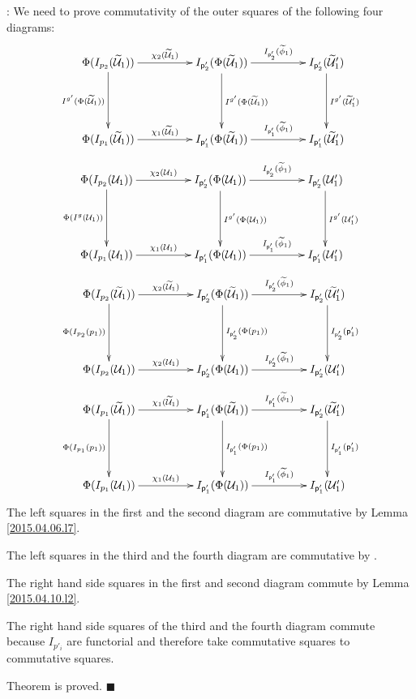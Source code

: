 \documentclass[12pt]{article}
\numberwithin{equation}{section}
\newenvironment{myproof}{{\bf Proof}:}{$\blacksquare$ \vskip 5mm }
\newcommand{\wt}{\widetilde}
\newcommand{\p}{\mathsf{p}}
\newcommand{\U}{\mathcal{U}}
\begin{document}
\begin{myproof}
We need to prove commutativity of the outer squares of the following four diagrams:
%
$$
\begin{xy}
          \xymatrix@C=4pc@R=4pc{
                 \Phi(I_{p_2}(\wt{\U}_1))  \ar[r]^-{\chi_2(\wt{\U}_1)} \ar[d]_-{I^{g'}(\Phi(\wt{\U}_1))} & 
                 I_{\p_2'}(\Phi(\wt{\U}_1)) \ar[r]^-{I_{\p_2'}(\wt{\phi}_1)} \ar[d]^-{I^{g'}(\Phi(\wt{\U}_1))} &
		I_{\p_2'}(\wt{\U}_1') \ar[d]^-{ I^{g'}(\wt{\U}_1')} \\
		\Phi(I_{p_1}(\wt{\U}_1))  \ar[r]^-{\chi_1(\wt{\U}_1)} &
		I_{\p_1'}(\Phi(\wt{\U}_1)) \ar[r]^-{I_{\p_1'}(\wt{\phi}_1)} &
		I_{\p_1'}(\wt{\U}_1')
                }
\end{xy}
$$
%
$$
\begin{xy}
          \xymatrix@C=4pc@R=4pc{ \Phi(I_{p_2}(\U_1)) \ar[r]^-{\chi_2(\U_1)}
            \ar[d]_-{\Phi(I^g(\U_1))} & I_{\p_2'}(\Phi(\U_1))
            \ar[r]^-{I_{\p_2'}(\wt{\phi}_1)} \ar[d]^-{I^{g'}(\Phi(\U_1))} &
            I_{\p_2'}(\U_1') \ar[d]^-{I^{g'}(\U_1')} \\ \Phi(I_{p_1}(\U_1))
            \ar[r]^-{\chi_1(\U_1)} & I_{\p_1'}(\Phi(\U_1))
            \ar[r]^-{I_{\p_1'}(\wt{\phi}_1)} & I_{\p_1'}(\U_1') }
\end{xy}
$$
%
$$
\begin{xy}
          \xymatrix@C=4pc@R=4pc{ \Phi(I_{p_2}(\wt{\U}_1))
            \ar[r]^-{\chi_2(\wt{\U}_1)} \ar[d]_-{\Phi(I_{p_2}(p_1))} &
            I_{\p_2'}(\Phi(\wt{\U}_1)) \ar[r]^-{I_{\p_2'}(\wt{\phi}_1)}
            \ar[d]^-{I_{\p_2'}(\Phi(p_1))} & I_{\p_2'}(\wt{\U}_1')
            \ar[d]^-{I_{\p_2'}(\p_1')} \\ \Phi(I_{p_2}(\U_1))
            \ar[r]^-{\chi_2(\U_1)} & I_{\p_2'}(\Phi(\U_1))
            \ar[r]^-{I_{\p_2'}(\wt{\phi}_1)} & I_{\p_2'}(\U_1') }
\end{xy}
$$
%
$$
\begin{xy}
          \xymatrix@C=4pc@R=4pc{ \Phi(I_{p_1}(\wt{\U}_1))
            \ar[r]^-{\chi_1(\wt{\U}_1)} \ar[d]_-{\Phi(I_{p_1}(p_1))} &
            I_{\p_1'}(\Phi(\wt{\U}_1)) \ar[r]^-{I_{\p_1'}(\wt{\phi}_1)}
            \ar[d]^-{I_{\p_1'}(\Phi(p_1))} & I_{\p_2'}(\wt{\U}_1')
            \ar[d]^-{I_{\p_1'}(\p_1')} \\ \Phi(I_{p_1}(\U_1))
            \ar[r]^-{\chi_1(\U_1)} & I_{\p_1'}(\Phi(\U_1))
            \ar[r]^-{I_{\p_1'}(\wt{\phi}_1)} & I_{\p_1'}(\U_1') }
\end{xy}
$$
%
The left squares in the first and the second diagram are commutative by Lemma
\ref{2015.04.06.l7}.

The left squares in the third and the fourth diagram are commutative by
\cite[Lemma 5.7]{fromunivwithPi}.

The right hand side squares in the first and second diagram commute by Lemma
\ref{2015.04.10.l2}.

The right hand side squares of the third and the fourth diagram commute because
$I_{p'_i}$ are functorial and therefore take commutative squares to commutative
squares.

Theorem is proved.
\end{myproof}
\end{document}
